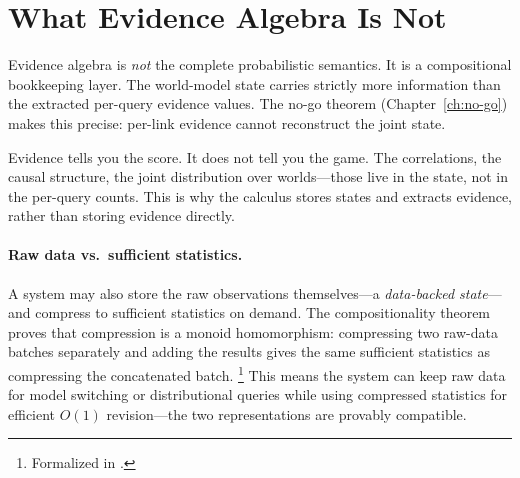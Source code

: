 \documentclass[11pt,openany]{report}
\begin{document}
\section{What Evidence Algebra Is Not}

Evidence algebra is \emph{not} the complete probabilistic semantics.
It is a compositional bookkeeping layer.  The world-model state
carries strictly more information than the extracted per-query evidence
values.  The no-go theorem (Chapter~\ref{ch:no-go}) makes this
precise: per-link evidence cannot reconstruct the joint state.

Evidence tells you the score.  It does not tell you the game.
The correlations, the causal structure, the joint distribution over
worlds---those live in the state, not in the per-query counts.  This
is why the calculus stores states and extracts evidence, rather than
storing evidence directly.

\paragraph{Raw data vs.\ sufficient statistics.}
A system may also store the raw observations themselves---a
\emph{data-backed state}---and compress to sufficient statistics
on demand.  The compositionality theorem
 proves that compression is a monoid
homomorphism: compressing two raw-data batches separately and
adding the results gives the same sufficient statistics as
compressing the concatenated batch.%
\footnote{Formalized in
.}
This means the system can keep raw data for model switching or
distributional queries while using compressed statistics for
efficient $O(1)$ revision---the two representations are provably
compatible.
\end{document}
